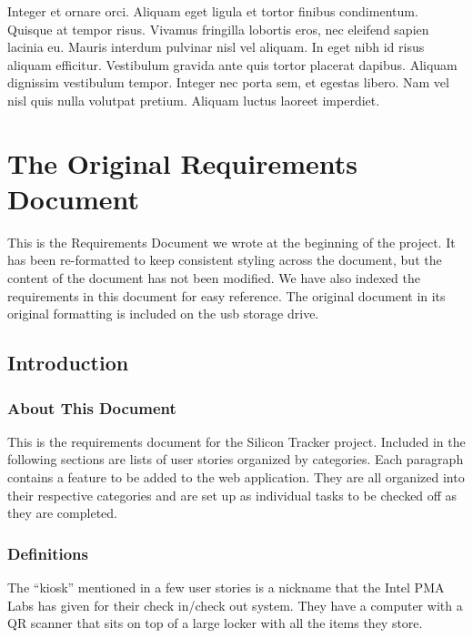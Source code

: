 \documentclass[10pt, onecolumn, twoside, peerreview]{IEEEtran}
\begin{document}
Integer et ornare orci. Aliquam eget ligula et tortor finibus condimentum. Quisque at tempor risus. Vivamus fringilla
lobortis eros, nec eleifend sapien lacinia eu. Mauris interdum pulvinar nisl vel aliquam. In eget nibh id risus aliquam
efficitur. Vestibulum gravida ante quis tortor placerat dapibus. Aliquam dignissim vestibulum tempor. Integer nec porta
sem, et egestas libero. Nam vel nisl quis nulla volutpat pretium. Aliquam luctus laoreet imperdiet.\\


\section{The Original Requirements Document}
This is the Requirements Document we wrote at the beginning of the
project. It has been re-formatted to keep consistent styling across the document, but the content of the document has
not been modified. We have also indexed the requirements in this document for easy reference. The original document in its original formatting is included on the usb storage drive.
\subsection{Introduction}

\subsubsection{About This Document}
This is the requirements document for the Silicon Tracker project. Included in the following sections are lists of user
stories organized by categories. Each paragraph contains a feature to be added to the web application. They are all
organized into their respective categories and are set up as individual tasks to be checked off as they are
completed.\\

\subsubsection{Definitions}
The “kiosk” mentioned in a few user stories is a nickname that the Intel PMA Labs has given for their check in/check
out system. They have a computer with a QR scanner that sits on top of a large locker with all the items they store.\\
\end{document}
